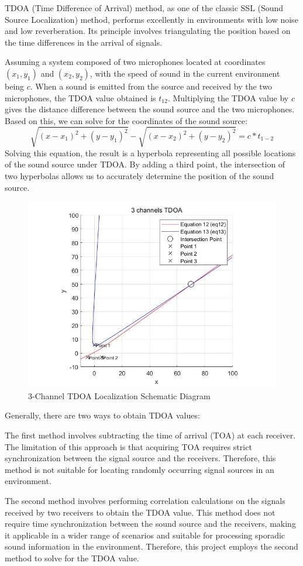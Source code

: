 
TDOA (Time Difference of Arrival) method, as one of the classic SSL (Sound Source Localization) method, performs excellently in environments with low noise and low reverberation. Its principle involves triangulating the position based on the time differences in the arrival of signals.

Assuming a system composed of two microphones located at coordinates \((x_1, y_1)\) and \((x_2, y_2)\), with the speed of sound in the current environment being \(c\). When a sound is emitted from the source and received by the two microphones, the TDOA value obtained is \(t_{12}\). Multiplying the TDOA value by \(c\) gives the distance difference between the sound source and the two microphones. Based on this, we can solve for the coordinates of the sound source:
\[
\sqrt{(x-x_{1})^{2}+(y-y_{1})^{2}}-\sqrt{(x-x_{2})^{2}+(y-y_{2})^{2}}=c*t_{1-2}
\]
Solving this equation, the result is a hyperbola representing all possible locations of the sound source under TDOA. By adding a third point, the intersection of two hyperbolas allows us to accurately determine the position of the sound source.\\
\begin{figure}[H]
    \centering
    \includegraphics[width=0.7\linewidth]{figures/3_Channels.jpg}
    \caption{3-Channel TDOA Localization Schematic Diagram}
\end{figure}
Generally, there are two ways to obtain TDOA values: 

The first method involves subtracting the time of arrival (TOA) at each receiver. The limitation of this approach is that acquiring TOA requires strict synchronization between the signal source and the receivers. Therefore, this method is not suitable for locating randomly occurring signal sources in an environment.

The second method involves performing correlation calculations on the signals received by two receivers to obtain the TDOA value. This method does not require time synchronization between the sound source and the receivers, making it applicable in a wider range of scenarios and suitable for processing sporadic sound information in the environment. Therefore, this project employs the second method to solve for the TDOA value. 

